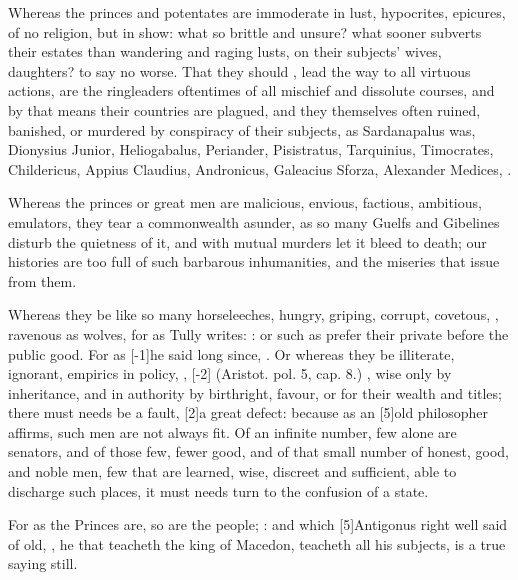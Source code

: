 {Whereas the princes and potentates are immoderate in lust, hypocrites,
epicures, of no religion, but in show:  what
so brittle and unsure? what sooner subverts their estates than
wandering and raging lusts, on their subjects' wives, daughters? to say
no worse. That they should , lead the way to all
virtuous actions, are the ringleaders oftentimes of all mischief and
dissolute courses, and by that means their countries are plagued,
and they themselves often ruined, banished, or murdered by
conspiracy of their subjects, as Sardanapalus was, Dionysius Junior,
Heliogabalus, Periander, Pisistratus, Tarquinius, Timocrates,
Childericus, Appius Claudius, Andronicus, Galeacius Sforza, Alexander
Medices, \etc{}.

Whereas the princes or great men are malicious, envious, factious,
ambitious, emulators, they tear a commonwealth asunder, as so many
Guelfs and Gibelines disturb the quietness of it, and with mutual
murders let it bleed to death; our histories are too full of such
barbarous inhumanities, and the miseries that issue from them.

Whereas they be like so many horseleeches, hungry, griping, corrupt,
 covetous, , ravenous as wolves, for as Tully
writes: : or such as prefer their private before the public
good. For as [-1\baselineskip]he said long since, . Or whereas they be illiterate, ignorant, empirics in policy,
, [-2\baselineskip] (Aristot. pol. 5, cap. 8.) ,
wise only by inheritance, and in authority by birthright, favour, or
for their wealth and titles; there must needs be a fault, [2\baselineskip]a great
defect: because as an [5\baselineskip]old philosopher affirms, such men are not
always fit. Of an infinite number, few alone are senators, and of those
few, fewer good, and of that small number of honest, good, and noble
men, few that are learned, wise, discreet and sufficient, able to
discharge such places, it must needs turn to the confusion of a state.

For as the Princes are, so are the people; :
and which [5\baselineskip]Antigonus right well said of old, , he that teacheth the king of
Macedon, teacheth all his subjects, is a true saying still.

}
